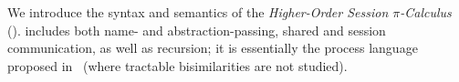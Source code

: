 \noindent 
We introduce the syntax and semantics of the 
\emph{Higher-Order Session $\pi$-Calculus} (\HOp).
\HOp includes both name- and abstraction-passing, shared and session communication,  
as well as recursion; it is 
essentially 
the process language
proposed 
in~\cite{tlca07} (where tractable bisimilarities are not studied). 
\smallskip





